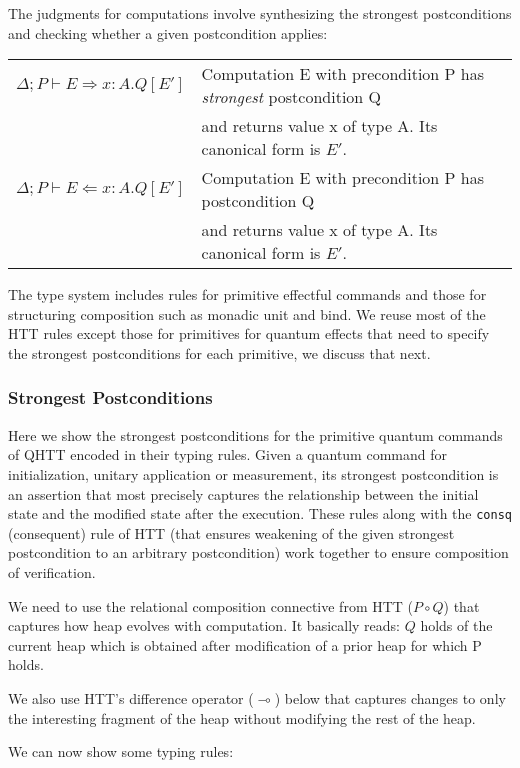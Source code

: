 \documentclass[acmsmall,nonacm,timestamp]{acmart}
\begin{document}
The judgments for computations involve synthesizing the strongest postconditions and checking whether a given postcondition applies:

\begin{center}
	\begin{tabular}{ll}
		$\Delta; P \vdash E \Rightarrow x:A.Q[E']$ & Computation E with precondition P has \textit{strongest} postcondition Q\\ & and returns value x of type A. Its canonical form is $E'$. \\
		$\Delta; P \vdash E \Leftarrow x:A.Q[E']$ & Computation E with precondition P has postcondition Q\\ & and returns value x of type A. Its canonical form is $E'$.
	\end{tabular}
\end{center}

The type system includes rules for primitive effectful commands and those for structuring composition such as monadic unit and bind. We reuse most of the HTT rules except those for primitives for quantum effects that need to specify the strongest postconditions for each primitive, we discuss that next.

\subsubsection{Strongest Postconditions}
Here we show the strongest postconditions for the primitive quantum commands of QHTT encoded in their typing rules. Given a quantum command for initialization, unitary application or measurement, its strongest postcondition is an assertion that most precisely captures the relationship between the initial state and the modified state after the execution. These rules along with the \texttt{consq} (consequent) rule of HTT (that ensures weakening of the given strongest postcondition to an arbitrary postcondition) work together to ensure composition of verification.

We need to use the relational composition connective from HTT ($P \circ Q$) that captures how heap evolves with computation. It basically reads: $Q$ holds of the current heap which is obtained after modification of a prior heap for which P holds.

We also use HTT's difference operator ($\multimap$) below that captures changes to only the interesting fragment of the heap without modifying the rest of the heap.

We can now show some typing rules:
\end{document}
